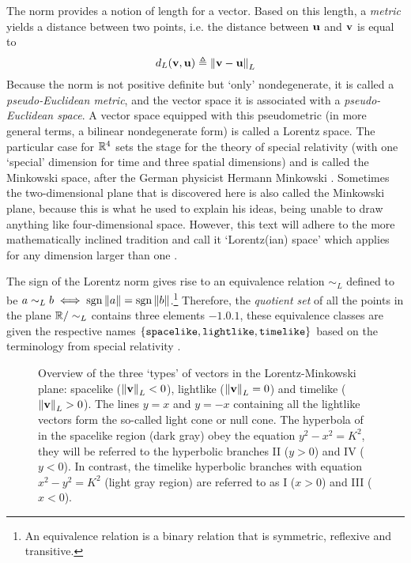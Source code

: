 The norm provides a notion of length for a vector. Based on this length, a \emph{metric} yields a distance between two points, i.e. the distance between $\vb{u}$ and $\vb{v}$ is equal to 
$$ d_L(\vb{v}, \vb{u}) \triangleq \norm{\vb{v} - \vb{u}}_L$$ 
Because the norm is not positive definite but `only' nondegenerate, it is called a \emph{pseudo-Euclidean metric}, and the vector space it is associated with a \emph{pseudo-Euclidean space}. A vector space equipped with this pseudometric (in more general terms, a bilinear nondegenerate form) is called a Lorentz space. The particular case for $\mathbb{R}^4$ sets the stage for the theory of special relativity (with one `special' dimension for time and three spatial dimensions) and is called the Minkowski space, after the German physicist Hermann Minkowski \cite{Catoni2008}. Sometimes the two-dimensional plane that is discovered here is also called the Minkowski plane, because this is what he used to explain his ideas, being unable to draw anything like four-dimensional space. However, this text will adhere to the more mathematically inclined tradition and call it `Lorentz(ian) space' which applies for any dimension larger than one \cite{Ratcliffe2019}. 

The sign of the Lorentz norm gives rise to an equivalence relation $\sim_L$ defined to be $a \sim_L b \iff \operatorname{sgn}{\norm{a}} = \operatorname{sgn}{\norm{b}}$.\footnote{An equivalence relation is a binary relation that is symmetric, reflexive and transitive.} Therefore, the \emph{quotient set} of all the points in the plane $\mathbb{R} / \sim_L $ contains three elements $\qty{-1, 0, 1}$, these equivalence classes are given the respective names $\qty{\text{\texttt{spacelike}}, \text{\texttt{lightlike}}, \text{\texttt{timelike}}}$ based on the terminology from special relativity \cite{Landau1971}.

\begin{figure}[ht]
    \centering
    
    \caption{Overview of the three `types' of vectors in the Lorentz-Minkowski plane: spacelike ($\norm{\vb{v}}_L < 0$), lightlike ($\norm{\vb{v}}_L = 0$) and timelike ($\norm{\vb{v}}_L > 0$). The lines $y = x$ and $y = -x$ containing all the lightlike vectors form the so-called light cone or null cone. The hyperbola of in the spacelike region (dark gray) obey the equation $y^2 - x^2 = K^2$, they will be referred to the hyperbolic branches II ($y > 0$) and IV ($y < 0$). In contrast, the timelike hyperbolic branches with equation $x^2 - y^2 = K^2$ (light gray region) are referred to as I ($x > 0$) and III ($x < 0$).}
    \label{fig:lightlike_spacelike}
\end{figure}

